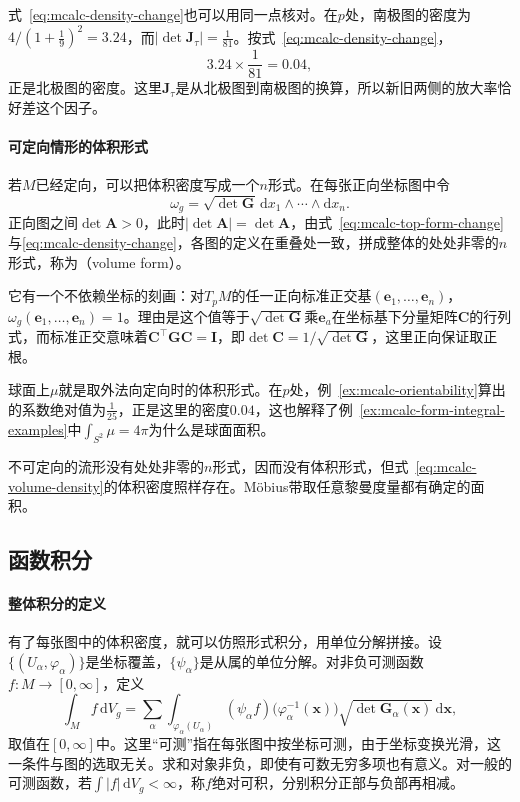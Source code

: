 式~\eqref{eq:mcalc-density-change}也可以用同一点核对。在$p$处，南极图的密度为$4/(1+\tfrac19)^2=3.24$，而$\lvert\det\bm J_\tau\rvert=\tfrac1{81}$。按式~\eqref{eq:mcalc-density-change}，
\[
3.24\times\frac1{81}=0.04 ,
\]
正是北极图的密度。这里$\bm J_\tau$是从北极图到南极图的换算，所以新旧两侧的放大率恰好差这个因子。

\paragraph{可定向情形的体积形式}
若$M$已经定向，可以把体积密度写成一个$n$形式。在每张正向坐标图中令
\begin{equation}
\omega_g=\sqrt{\det\bm G}\,\mathrm dx_1\wedge\cdots\wedge\mathrm dx_n .
\label{eq:mcalc-volume-form}
\end{equation}
正向图之间$\det\bm A>0$，此时$\lvert\det\bm A\rvert=\det\bm A$，由式~\eqref{eq:mcalc-top-form-change}与\eqref{eq:mcalc-density-change}，各图的定义在重叠处一致，拼成整体的处处非零的$n$形式，称为（volume form）。

它有一个不依赖坐标的刻画：对$T_pM$的任一正向标准正交基$(\bm e_1,\ldots,\bm e_n)$，$\omega_g(\bm e_1,\ldots,\bm e_n)=1$。理由是这个值等于$\sqrt{\det\bm G}$乘$\bm e_a$在坐标基下分量矩阵$\bm C$的行列式，而标准正交意味着$\bm C^{\top}\bm G\bm C=\bm I$，即$\det\bm C=1/\sqrt{\det\bm G}$，这里正向保证取正根。

球面上$\mu$就是取外法向定向时的体积形式。在$p$处，例~\ref{ex:mcalc-orientability}算出的系数绝对值为$\tfrac1{25}$，正是这里的密度$0.04$，这也解释了例~\ref{ex:mcalc-form-integral-examples}中$\int_{S^2}\mu=4\pi$为什么是球面面积。

不可定向的流形没有处处非零的$n$形式，因而没有体积形式，但式~\eqref{eq:mcalc-volume-density}的体积密度照样存在。M\"obius带取任意黎曼度量都有确定的面积。

\subsection{函数积分}
\label{sec:mcalc-function-integration}

\paragraph{整体积分的定义}
有了每张图中的体积密度，就可以仿照形式积分，用单位分解拼接。设$\{(U_\alpha,\varphi_\alpha)\}$是坐标覆盖，$\{\psi_\alpha\}$是从属的单位分解。对非负可测函数$f:M\to[0,\infty]$，定义
\begin{equation}
\int_Mf\,\mathrm dV_g=\sum_\alpha\int_{\varphi_\alpha(U_\alpha)}(\psi_\alpha f)\bigl(\varphi_\alpha^{-1}(\bm x)\bigr)\sqrt{\det\bm G_\alpha(\bm x)}\,\mathrm d\bm x ,
\label{eq:mcalc-function-integral}
\end{equation}
取值在$[0,\infty]$中。这里“可测”指在每张图中按坐标可测，由于坐标变换光滑，这一条件与图的选取无关。求和对象非负，即使有可数无穷多项也有意义。对一般的可测函数，若$\int\lvert f\rvert\,\mathrm dV_g<\infty$，称$f$绝对可积，分别积分正部与负部再相减。

